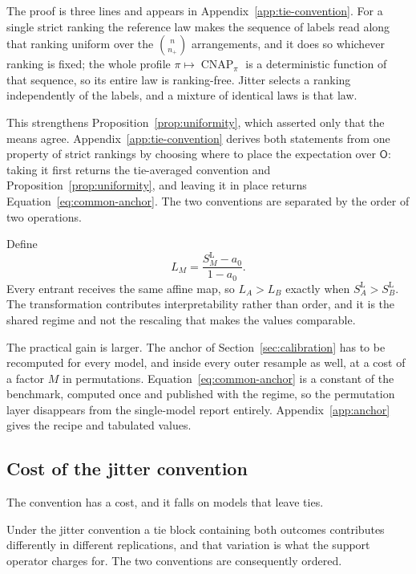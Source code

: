 \documentclass[11pt]{article}
\newcommand{\CNAP}{\operatorname{CNAP}}
\newcommand{\Rank}{\mathsf{O}}
\newcommand{\SLead}{S^{\mathrm{L}}}
\theoremstyle{remark}
\begin{document}
The proof is three lines and appears in Appendix~\ref{app:tie-convention}. For a single strict ranking the reference law makes the sequence of labels read along that ranking uniform over the $\binom{n}{n_+}$ arrangements, and it does so whichever ranking is fixed; the whole profile $\pi\mapsto\CNAP_\pi$ is a deterministic function of that sequence, so its entire law is ranking-free. Jitter selects a ranking independently of the labels, and a mixture of identical laws is that law.

This strengthens Proposition~\ref{prop:uniformity}, which asserted only that the means agree. Appendix~\ref{app:tie-convention} derives both statements from one property of strict rankings by choosing where to place the expectation over $\Rank$: taking it first returns the tie-averaged convention and Proposition~\ref{prop:uniformity}, and leaving it in place returns Equation~\eqref{eq:common-anchor}. The two conventions are separated by the order of two operations.

Define
\begin{equation}
L_M
=
\frac{\SLead_M-a_0}{1-a_0}.
\label{eq:leaderboard}
\end{equation}
Every entrant receives the same affine map, so $L_A>L_B$ exactly when $\SLead_A>\SLead_B$. The transformation contributes interpretability rather than order, and it is the shared regime and not the rescaling that makes the values comparable.

The practical gain is larger. The anchor of Section~\ref{sec:calibration} has to be recomputed for every model, and inside every outer resample as well, at a cost of a factor $M$ in permutations. Equation~\eqref{eq:common-anchor} is a constant of the benchmark, computed once and published with the regime, so the permutation layer disappears from the single-model report entirely. Appendix~\ref{app:anchor} gives the recipe and tabulated values.

\subsection{Cost of the jitter convention}
\label{sec:jitter-cost}

The convention has a cost, and it falls on models that leave ties.

Under the jitter convention a tie block containing both outcomes contributes differently in different replications, and that variation is what the support operator charges for. The two conventions are consequently ordered.
\end{document}
